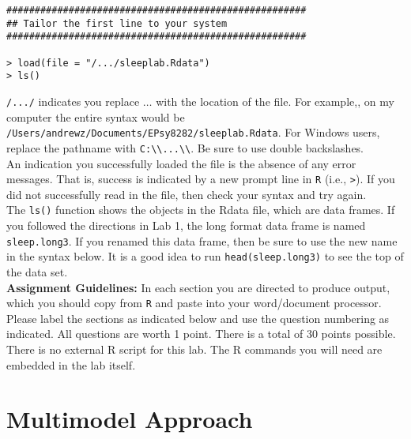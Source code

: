 \documentclass[]{article}
\begin{document}
\begin{shaded}
\begin{lstlisting}
#####################################################
## Tailor the first line to your system 
#####################################################

> load(file = "/.../sleeplab.Rdata")
> ls()
\end{lstlisting}
\end{shaded}

\noindent \verb,/.../, indicates you replace $\ldots$ with the location of the file. For example,, on my computer the entire syntax would be \texttt{/Users/andrewz/Documents/EPsy8282/sl\allowbreak eeplab.Rdata}. For Windows users, replace the pathname with \verb,C:\\...\\,. Be sure to use double backslashes. \\
\linebreak
An indication you successfully loaded the file is the absence of any error messages. That is,
success is indicated by a new prompt line in \texttt{R} (i.e., \texttt{>}). If you did not
successfully read in the file, then check your syntax and try again. \\
\linebreak
The \texttt{ls()} function shows the objects in the Rdata file, which are data frames. If you
followed the directions in Lab 1, the long format data frame is named \texttt{sleep.long3}. If you renamed this data frame, then be sure to use the new name in the syntax below. It is a good idea to run \texttt{head(sleep.long3)} to see the top of the data set.\\
\linebreak
\textbf{Assignment Guidelines:} In each section you are directed to produce output, which you should copy from \texttt{R} and paste into your word/document processor. Please label the sections as indicated below and use the question numbering as indicated. All questions are worth 1 point. There is a total of 30 points possible. There is no external R script for this lab. The R commands you will need are embedded in the lab itself.

%
%

\section*{Multimodel Approach} 
 
\end{document}

